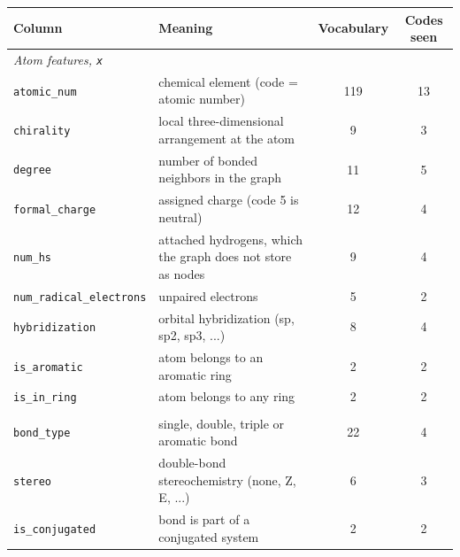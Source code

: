 \begin{tabular}{llcc}
\toprule
Column & Meaning & Vocabulary & Codes seen \\
\midrule
\multicolumn{4}{l}{\itshape Atom features, \texttt{x}} \\
\texttt{atomic\_num} & chemical element (code = atomic number) & 119 & 13 \\
\texttt{chirality} & local three-dimensional arrangement at the atom & 9 & 3 \\
\texttt{degree} & number of bonded neighbors in the graph & 11 & 5 \\
\texttt{formal\_charge} & assigned charge (code 5 is neutral) & 12 & 4 \\
\texttt{num\_hs} & attached hydrogens, which the graph does not store as nodes & 9 & 4 \\
\texttt{num\_radical\_electrons} & unpaired electrons & 5 & 2 \\
\texttt{hybridization} & orbital hybridization (sp, sp2, sp3, ...) & 8 & 4 \\
\texttt{is\_aromatic} & atom belongs to an aromatic ring & 2 & 2 \\
\texttt{is\_in\_ring} & atom belongs to any ring & 2 & 2 \\
\addlinespace
\multicolumn{4}{l}{\itshape Bond features, \texttt{edge\_attr}} \\
\texttt{bond\_type} & single, double, triple or aromatic bond & 22 & 4 \\
\texttt{stereo} & double-bond stereochemistry (none, Z, E, ...) & 6 & 3 \\
\texttt{is\_conjugated} & bond is part of a conjugated system & 2 & 2 \\
\bottomrule
\end{tabular}
